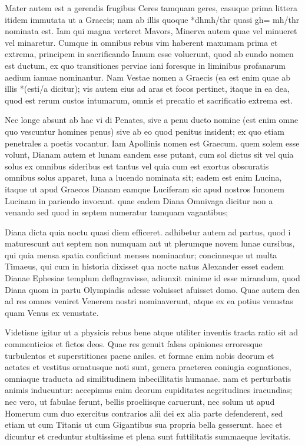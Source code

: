  Mater autem est a gerendis frugibus Ceres tamquam geres, casuque prima littera itidem immutata ut a Graecis; nam ab illis quoque *dhmh/thr quasi gh= mh/thr nominata est. Iam qui magna verteret Mavors, Minerva autem quae vel minueret vel minaretur. Cumque in omnibus rebus vim haberent maxumam prima et extrema, principem in sacrificando Ianum esse voluerunt, quod ab eundo nomen est ductum, ex quo transitiones perviae iani foresque in liminibus profanarum aedium ianuae nominantur. Nam Vestae nomen a Graecis (ea est enim quae ab illis *(esti/a dicitur); vis autem eius ad aras et focos pertinet, itaque in ea dea, quod est rerum custos intumarum, omnis et precatio et sacrificatio extrema est.

 Nec longe absunt ab hac vi di Penates, sive a penu ducto nomine (est enim omne quo vescuntur homines penus) sive ab eo quod penitus insident; ex quo etiam penetrales a poetis vocantur. Iam Apollinis nomen est Graecum. quem solem esse volunt, Dianam autem et lunam eandem esse putant, cum sol dictus sit vel quia solus ex omnibus sideribus est tantus vel quia cum est exortus obscuratis omnibus solus apparet, luna a lucendo nominata sit; eadem est enim Lucina, itaque ut apud Graecos Dianam eamque Luciferam sic apud nostros Iunonem Lucinam in pariendo invocant. quae eadem Diana Omnivaga dicitur non a venando sed quod in septem numeratur tamquam vagantibus;

 Diana dicta quia noctu quasi diem efficeret. adhibetur autem ad partus, quod i maturescunt aut septem non numquam aut ut plerumque novem lunae cursibus, qui quia mensa spatia conficiunt menses nominantur; concinneque ut multa Timaeus, qui cum in historia dixisset qua nocte natus Alexander esset eadem Dianae Ephesiae templum deflagravisse, adiunxit minime id esse mirandum, quod Diana quom in partu Olympiadis adesse voluisset afuisset domo. Quae autem dea ad res omnes veniret Venerem nostri nominaverunt, atque ex ea potius venustas quam Venus ex venustate.

 Videtisne igitur ut a physicis rebus bene atque utiliter inventis tracta ratio sit ad commenticios et fictos deos. Quae res genuit falsas opiniones erroresque turbulentos et superstitiones paene aniles. et formae enim nobis deorum et aetates et vestitus ornatusque noti sunt, genera praeterea coniugia cognationes, omniaque traducta ad similitudinem inbecillitatis humanae. nam et perturbatis animis inducuntur: accepimus enim deorum cupiditates aegritudines iracundias; nec vero, ut fabulae ferunt, bellis proeliisque caruerunt, nec solum ut apud Homerum cum duo exercitus contrarios alii dei ex alia parte defenderent, sed etiam ut cum Titanis ut cum Gigantibus sua propria bella gesserunt. haec et dicuntur et creduntur stultissime et plena sunt futtilitatis summaeque levitatis.

